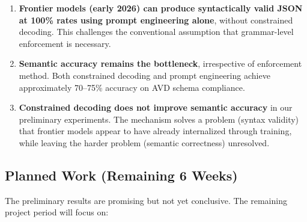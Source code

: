 \documentclass[11pt, letterpaper]{article}
\begin{document}
\begin{enumerate}
    \item \textbf{Frontier models (early 2026) can produce syntactically valid JSON at 100\% rates using prompt engineering alone}, without constrained decoding. This challenges the conventional assumption that grammar-level enforcement is necessary.
    \item \textbf{Semantic accuracy remains the bottleneck}, irrespective of enforcement method. Both constrained decoding and prompt engineering achieve approximately 70--75\% accuracy on AVD schema compliance.
    \item \textbf{Constrained decoding does not improve semantic accuracy} in our preliminary experiments. The mechanism solves a problem (syntax validity) that frontier models appear to have already internalized through training, while leaving the harder problem (semantic correctness) unresolved.
\end{enumerate}

\subsection{Planned Work (Remaining 6 Weeks)}
\label{sec:next_steps}

The preliminary results are promising but not yet conclusive. The remaining project period will focus on:
\end{document}
